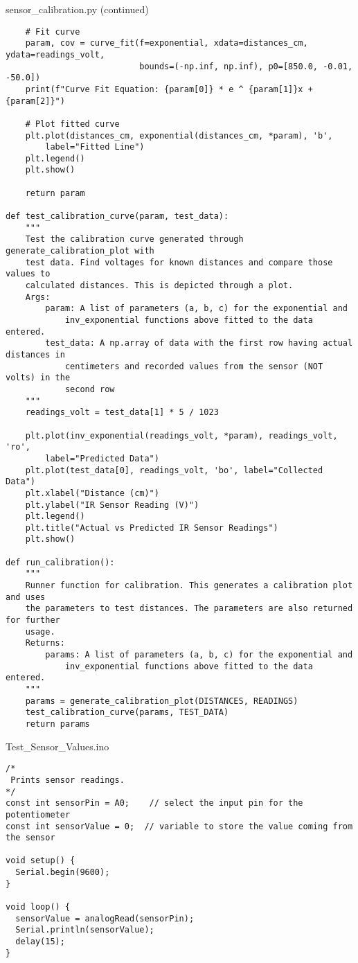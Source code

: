 \documentclass{article}
\begin{document}
\begin{tcolorbox}
sensor\_calibration.py (continued)
\begin{verbatim}
    # Fit curve
    param, cov = curve_fit(f=exponential, xdata=distances_cm, ydata=readings_volt,
                           bounds=(-np.inf, np.inf), p0=[850.0, -0.01, -50.0])
    print(f"Curve Fit Equation: {param[0]} * e ^ {param[1]}x + {param[2]}")

    # Plot fitted curve
    plt.plot(distances_cm, exponential(distances_cm, *param), 'b', 
        label="Fitted Line")
    plt.legend()
    plt.show()

    return param

def test_calibration_curve(param, test_data):
    """
    Test the calibration curve generated through generate_calibration_plot with
    test data. Find voltages for known distances and compare those values to
    calculated distances. This is depicted through a plot.
    Args:
        param: A list of parameters (a, b, c) for the exponential and
            inv_exponential functions above fitted to the data entered.
        test_data: A np.array of data with the first row having actual distances in
            centimeters and recorded values from the sensor (NOT volts) in the
            second row
    """
    readings_volt = test_data[1] * 5 / 1023

    plt.plot(inv_exponential(readings_volt, *param), readings_volt, 'ro',
        label="Predicted Data")
    plt.plot(test_data[0], readings_volt, 'bo', label="Collected Data")
    plt.xlabel("Distance (cm)")
    plt.ylabel("IR Sensor Reading (V)")
    plt.legend()
    plt.title("Actual vs Predicted IR Sensor Readings")
    plt.show()

def run_calibration():
    """
    Runner function for calibration. This generates a calibration plot and uses
    the parameters to test distances. The parameters are also returned for further
    usage.
    Returns:
        params: A list of parameters (a, b, c) for the exponential and 
            inv_exponential functions above fitted to the data entered.
    """
    params = generate_calibration_plot(DISTANCES, READINGS)
    test_calibration_curve(params, TEST_DATA)
    return params
\end{verbatim}
\end{tcolorbox}



\begin{tcolorbox}
Test\_Sensor\_Values.ino
\begin{verbatim}
/*
 Prints sensor readings.
*/
const int sensorPin = A0;    // select the input pin for the potentiometer
const int sensorValue = 0;  // variable to store the value coming from the sensor

void setup() {
  Serial.begin(9600);
}

void loop() {
  sensorValue = analogRead(sensorPin);
  Serial.println(sensorValue);
  delay(15);
}
\end{verbatim}
\end{tcolorbox}
\end{document}
